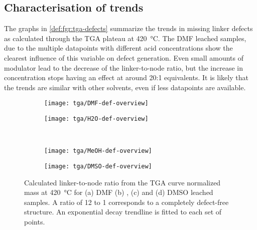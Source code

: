 
\subsection{Characterisation of trends}\label{def:trends}

The graphs in \autoref{def:fgr:tga-defects} summarize the 
trends in missing linker defects as calculated through 
the TGA plateau at \SI{420}{\degreeCelsius}. The DMF leached samples,
due to the multiple datapoints with different acid concentrations
show the clearest influence of this variable on defect
generation. Even small amounts of modulator lead to the decrease of 
the linker-to-node ratio, but the increase in concentration stops 
having an effect at around 20:1 equivalents. It is likely that
the trends are similar with other solvents, even if less 
datapoints are available.

\begin{figure}[htb]
    \centering

    \begin{subfigure}{0.33\linewidth}
		\parbox[c]{0.12\linewidth}{\caption{}%
			\label{def:fgr:tga-dmf-linkers}}%
		\parbox[b]{0.88\linewidth}{%
			\texttt{[image: tga/DMF-def-overview]}%
		}%
    \end{subfigure}%
    \begin{subfigure}{0.33\linewidth}
		\parbox[c]{0.12\linewidth}{\caption{}%
			\label{def:fgr:tga-h2o-linkers}}%
		\parbox[b]{0.88\linewidth}{%
			\texttt{[image: tga/H2O-def-overview]}%
		}%
    \end{subfigure}%
    \\
    \begin{subfigure}{0.33\linewidth}
		\parbox[c]{0.12\linewidth}{\caption{}%
			\label{def:fgr:tga-meoh-linkers}}%
		\parbox[b]{0.88\linewidth}{%
			\texttt{[image: tga/MeOH-def-overview]}%
		}%
    \end{subfigure}%
    \begin{subfigure}{0.33\linewidth}
		\parbox[c]{0.12\linewidth}{\caption{}%
			\label{def:fgr:tga-dmso-linkers}}%
		\parbox[b]{0.88\linewidth}{%
			\texttt{[image: tga/DMSO-def-overview]}%
		}%
    \end{subfigure}%

    \caption{Calculated linker-to-node ratio from the TGA curve 
    normalized mass at \SI{420}{\degreeCelsius} for (a) DMF 
    (b) , (c)  and (d) DMSO leached samples.
    A ratio of 12 to 1 corresponds to a completely defect-free
    structure. An exponential decay trendline is fitted to 
    each set of points.}%
    \label{def:fgr:tga-defects}
    
\end{figure}


